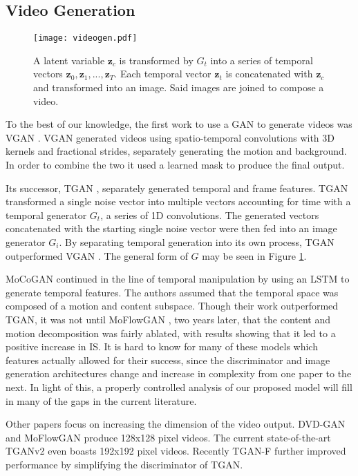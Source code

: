 \documentclass[tablecaption=bottom,pmlr]{jmlr}
\begin{document}
\subsection{Video Generation}

\begin{figure}
    \centering
    \texttt{[image: videogen.pdf]}
    \caption{A latent variable $\mathbf{z}_c$ is transformed by $G_t$ into a series of temporal vectors $\mathbf{z}_0, \mathbf{z}_1, ..., \mathbf{z}_T$. Each temporal vector $\mathbf{z}_t$ is concatenated with $\mathbf{z}_c$ and transformed into an image. Said images are joined to compose a video.}
    \label{fig:vid_gen}
\end{figure}

To the best of our knowledge, the first work to use a GAN to generate videos was VGAN \citep{vgan}. VGAN generated videos using  spatio-temporal convolutions with 3D kernels and fractional strides, separately generating the motion and background. In order to combine the two it used a learned mask to produce the final output. 

Its successor, TGAN \citep{tgan}, separately generated temporal and frame features. TGAN transformed a single noise vector into multiple vectors accounting for time with a temporal generator $G_t$, a series of 1D convolutions. The generated vectors concatenated with the starting single noise vector were then fed into an image generator $G_i$. By separating temporal generation into its own process, TGAN outperformed VGAN \citep{inceptionscore}. The general form of $G$ may be seen in Figure \ref{fig:vid_gen}.

MoCoGAN \citep{mocogan} continued in the line of temporal manipulation by using an LSTM to generate temporal features. The authors assumed that the temporal space was composed of a motion and content subspace. Though their work outperformed TGAN, it was not until MoFlowGAN \citep{moflowgan}, two years later, that the content and motion decomposition was fairly ablated, with results showing that it led to a positive increase in IS. It is hard to know for many of these models which features actually allowed for their success, since the discriminator and image generation architectures change and increase in complexity from one paper to the next. In light of this, a properly controlled analysis of our proposed model will fill in many of the gaps in the current literature.

Other papers focus on increasing the dimension of the video output. DVD-GAN and MoFlowGAN \citep{dvdgan, moflowgan} produce 128x128 pixel videos. The current state-of-the-art TGANv2 \citep{tganv2} even boasts 192x192 pixel videos. Recently TGAN-F \citep{tganf} further improved performance by simplifying the discriminator of TGAN.
\end{document}
